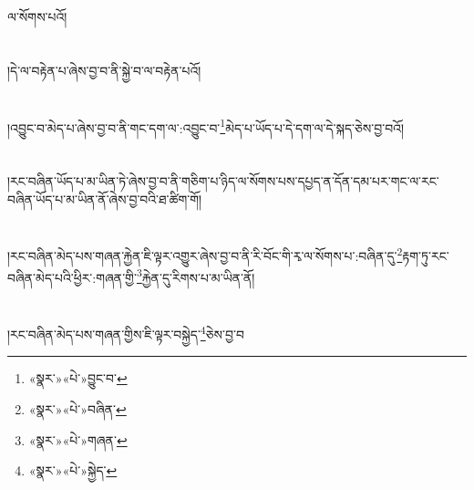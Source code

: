 ལ་སོགས་པའོ།\chapter{ }།དེ་ལ་བརྟེན་པ་ཞེས་བྱ་བ་ནི་སྐྱེ་བ་ལ་བརྟེན་པའོ།\chapter{ }།འབྱུང་བ་མེད་པ་ཞེས་བྱ་བ་ནི་གང་དག་ལ་:འབྱུང་བ་\footnote{«སྣར་»«པེ་»བྱུང་བ་}མེད་པ་ཡོད་པ་དེ་དག་ལ་དེ་སྐད་ཅེས་བྱ་བའོ།\chapter{ }།རང་བཞིན་ཡོད་པ་མ་ཡིན་ཏེ་ཞེས་བྱ་བ་ནི་གཅིག་པ་ཉིད་ལ་སོགས་པས་དཔྱད་ན་དོན་དམ་པར་གང་ལ་རང་བཞིན་ཡོད་པ་མ་ཡིན་ནོ་ཞེས་བྱ་བའི་ཐ་ཚིག་གོ།\chapter{ }།རང་བཞིན་མེད་པས་གཞན་རྐྱེན་ཇི་ལྟར་འགྱུར་ཞེས་བྱ་བ་ནི་རི་བོང་གི་རྭ་ལ་སོགས་པ་:བཞིན་དུ་\footnote{«སྣར་»«པེ་»བཞིན་}རྟག་ཏུ་རང་བཞིན་མེད་པའི་ཕྱིར་:གཞན་གྱི་\footnote{«སྣར་»«པེ་»གཞན་}རྐྱེན་དུ་རིགས་པ་མ་ཡིན་ནོ།\chapter{ }།རང་བཞིན་མེད་པས་གཞན་གྱིས་ཇི་ལྟར་བསྐྱེད་\footnote{«སྣར་»«པེ་»སྐྱེད་}ཅེས་བྱ་བ